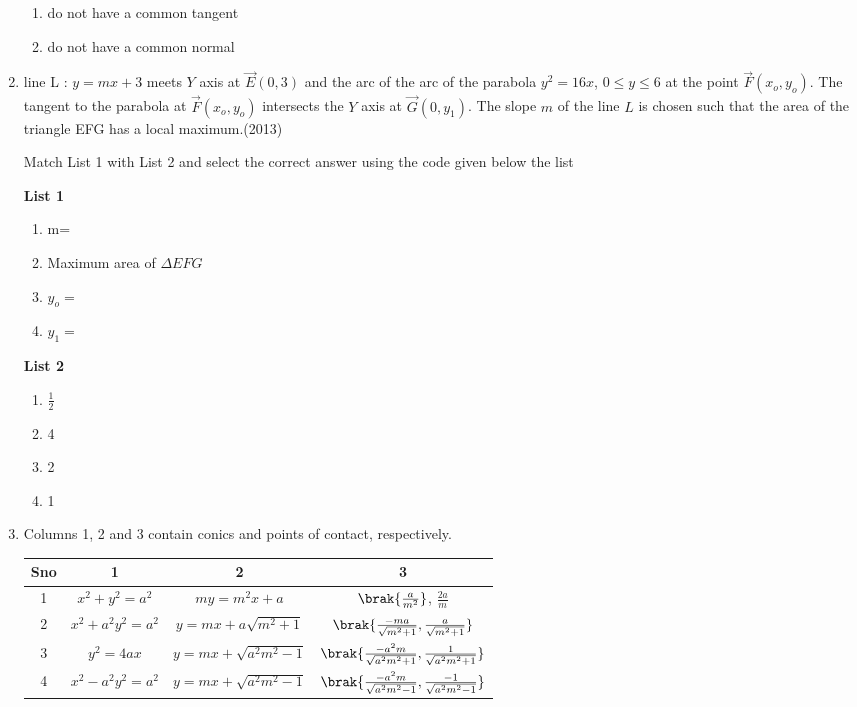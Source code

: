 \begin{enumerate}
\begin{multicols}{2}
\begin{enumerate}
    \item do not have a common tangent
    \item do not have a common normal
\end{enumerate}
\end{multicols}
\item line L : $y = mx + 3$ meets $Y$ axis at $\vec{E}(0,3)$ and the arc of the arc of the parabola $y^2 = 16x$, $ 0\leq y \leq6$ at the point $\vec{F}(x_o,y_o)$. The tangent to the parabola at $\vec{F}(x_o,y_o)$ intersects the $Y$ axis at $\vec{G}(0,y_1)$. The slope $m$ of the line $L$ is chosen such that the area of the triangle EFG has a local maximum.\hfill{(2013)} 

Match List 1 with List 2 and select the correct answer using the code given below the list 
\begin{multicols}{2}
\textbf{List 1}
\begin{enumerate}
    \item m=
    \item Maximum area of $\Delta EFG$
    \item $y_o=$
    \item $y_1=$
\end{enumerate}
\textbf{List 2}
\begin{enumerate}
    \item $\frac{1}{2}$
    \item 4
    \item 2
    \item 1
\end{enumerate}
\end{multicols}
\item  Columns 1, 2 and 3 contain conics and points of contact, respectively.
\begin{table}[h!]
\centering
\begin{tabular}{|c|c|c|c|}
\hline
Sno & 1       & 2 & 3 \\
\hline
	1 & $x^2 + y^2 = a^2$ & $my = m^2x + a$ & $\brak{\frac{a}{m^2}}$, $\frac{2a}{m}$ \\
	2 & $x^2 + a^2y^2 = a^2  $      & $y = mx +a\sqrt{m^2 + 1}$  & $\brak{\frac{-ma}{\sqrt{m^2 + 1}},\frac{a}{\sqrt{m^2 + 1}}}   $   \\
	3 & $y^2=4ax $  & $y = mx + \sqrt{a^2m^2 - 1}$ & $\brak{\frac{-a^2m}{\sqrt{a^2m^2 + 1}}, \frac{1}{\sqrt{a^2m^2 + 1}}}$    \\
	4 & $x^2 - a^2y^2 = a^2$     & $y = mx + \sqrt{a^2m^2 - 1 }$  & $\brak{\frac{-a^2m}{\sqrt{a^2m^2 - 1}}, \frac{-1}{\sqrt{a^2m^2 - 1}}}$      \\


\end{tabular}
\end{table}
\end{enumerate}
